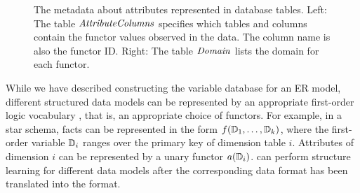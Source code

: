 \begin{table}[hbtp]
\caption{Selected Tables In the Variable Database Schema.}
 \centering
 \label{table:vdb-schema}
\end{table}


\begin{figure}[htbp] %
 \centering
{} 
\caption{ The metadata about attributes represented in \RVD database tables.  Left: The table $\it{AttributeColumns}$ specifies which tables and columns contain the functor values observed in the data. The column name is also the functor ID. Right: The table $\it{Domain}$ lists the domain for each functor.
}
 \label{fig:attributes}
\end{figure}
%
While we have described constructing the variable database for an ER model, different structured data models can be represented by an appropriate first-order logic vocabulary \cite{Kimmig2015}, that is, an appropriate choice of functors. For example, in a star schema, facts can be represented in the form $f(\mathbb{D}_{1},\ldots,\mathbb{D}_{k})$, where the first-order variable $\mathbb{D}_{i}$ ranges over the primary key of dimension table $i$. Attributes of dimension $i$ can be represented by a unary functor $a(\mathbb{D}_{i})$. \FB can perform structure learning for different data models after the corresponding data format has been translated into the \RVD format.

